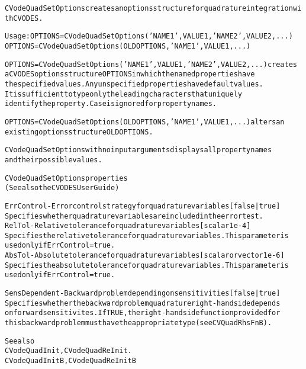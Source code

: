 \begin{alltt}
CVodeQuadSetOptions creates an options structure for quadrature integration with CVODES.

   Usage: OPTIONS = CVodeQuadSetOptions('NAME1',VALUE1,'NAME2',VALUE2,...)
          OPTIONS = CVodeQuadSetOptions(OLDOPTIONS,'NAME1',VALUE1,...)

   OPTIONS = CVodeQuadSetOptions('NAME1',VALUE1,'NAME2',VALUE2,...) creates 
   a CVODES options structure OPTIONS in which the named properties have 
   the specified values. Any unspecified properties have default values. 
   It is sufficient to type only the leading characters that uniquely 
   identify the property. Case is ignored for property names. 
   
   OPTIONS = CVodeQuadSetOptions(OLDOPTIONS,'NAME1',VALUE1,...) alters an 
   existing options structure OLDOPTIONS.
   
   CVodeQuadSetOptions with no input arguments displays all property names 
   and their possible values.
   
CVodeQuadSetOptions properties
(See also the CVODES User Guide)

ErrControl - Error control strategy for quadrature variables [ {false} | true ]
   Specifies whether quadrature variables are included in the error test.
RelTol - Relative tolerance for quadrature variables [ scalar {1e-4} ]
   Specifies the relative tolerance for quadrature variables. This parameter is
   used only if ErrControl = true.
AbsTol - Absolute tolerance for quadrature variables [ scalar or vector {1e-6} ]
   Specifies the absolute tolerance for quadrature variables. This parameter is
   used only if ErrControl = true.

SensDependent - Backward problem depending on sensitivities [ {false} | true ]
   Specifies whether the backward problem quadrature right-hand side depends
   on forward sensitivites. If TRUE, the right-hand side function provided for
   this backward problem must have the appropriate type (see CVQuadRhsFnB).


   See also
        CVodeQuadInit, CVodeQuadReInit.
        CVodeQuadInitB, CVodeQuadReInitB
\end{alltt}






\vspace{0.1in}